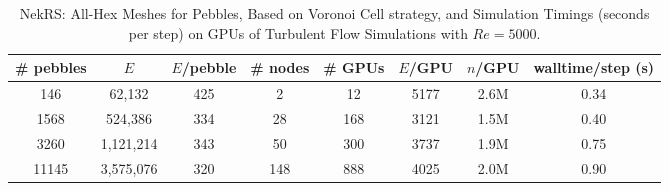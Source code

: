  \begin{table}
   \centering
   \begin{tabular}{cccccccc}
   \hline \hline
     \# pebbles & $E$ & $E$/pebble & \# nodes & \# GPUs & $E$/GPU & $n$/GPU & walltime/step (s) \\
   \hline
    146 & 62,132 & 425 & 2 & 12 & 5177 & 2.6M &  0.34    \\
    1568 & 524,386 & 334 & 28 & 168 & 3121 & 1.5M & 0.40   \\
    3260 & 1,121,214 & 343 & 50 & 300 & 3737 & 1.9M & 0.75   \\
    11145 & 3,575,076 & 320 & 148 & 888 & 4025 & 2.0M & 0.90  \\

     \hline \hline
   \end{tabular}
   \caption{NekRS: All-Hex Meshes for Pebbles, Based on Voronoi Cell strategy, and Simulation Timings (seconds per step) on GPUs
    of Turbulent Flow Simulations with $Re = 5000$.}
   \label{tab:pebble}
 \end{table}

